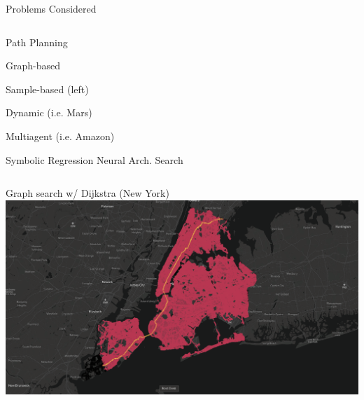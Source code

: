 \documentclass[aspectratio=169]{beamer}
\makeatletter
\renewcommand{\emph}[1]{{\Huge \color{pureminimalistic@text@red} #1}}
\newcommand{\white}[1]{{\color{pureminimalistic@text@white} #1}}
\makeatother
\begin{document}
\begin{frame}[plain]{\white{Problems Considered}}
\begin{columns}[T]
\begin{column}{.5\linewidth}
          \emph{Path Planning}
          \begin{vfilleditems}
              \item {\Large Graph-based}
              \vspace{1em}
              \item {\Large Sample-based \Medium (left)}
              \vspace{1em}
              \item {\color{grey} {\Large Dynamic (i.e. Mars)}}
              \vspace{1em}
              \item {\color{grey} {\Large Multiagent (i.e. Amazon)}}
          \end{vfilleditems}
          \vspace{1em}
          {\color{grey} {\Large Symbolic Regression}}
          \vspace{1em}
          {\color{grey} {\Large Neural Arch. Search}}
      \end{column}
  \end{columns}
\end{frame}

\begin{frame}[plain]{Graph search w/ Dijkstra \white{(New York)}}
    \includegraphics[width=1.0\linewidth, keepaspectratio, trim={0cm, 2cm, 1cm, 0.5cm}, clip]{figures/ny_graph_based.png}
\end{frame}
\end{document}
